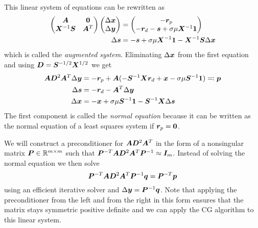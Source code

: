 This linear system of equations can be rewritten as
\begin{subequations}\label{eqn:augmented-system}
  \begin{align}
    \begin{pmatrix}
      \bm{A}              & \bm{0} \\
      \bm{X}^{-1} \bm{S} & \bm{A}^T \\
    \end{pmatrix}
    \begin{pmatrix}
      \Delta\bm{x} \\
      \Delta\bm{y}
    \end{pmatrix}
    &=
    \begin{pmatrix}
      -\bm{r}_p \\
      -\bm{r}_d -\bm{s} + \sigma \mu \bm{X}^{-1} \bm{1}
    \end{pmatrix} \\
    \Delta\bm{s} &= -\bm{s} + \sigma \mu \bm{X}^{-1} \bm{1} - \bm{X}^{-1} \bm{S} \Delta\bm{x}
  \end{align}
\end{subequations}
which is called the \emph{augmented system}.
Eliminating \(\Delta\bm{x}\) from the first equation and using \(\bm{D} = \bm{S}^{-1/2} \bm{X}^{1/2}\) we get
\begin{subequations}\label{eqn:normal-equation-system}
  \begin{align}
    \bm{A} \bm{D}^2 \bm{A}^T \Delta\bm{y} &= -\bm{r}_p + \bm{A} ( -\bm{S}^{-1} \bm{X} \bm{r}_d + \bm{x} - \sigma \mu \bm{S}^{-1} \bm{1} ) \eqqcolon \bm{p} \label{eqn:normal-equation} \\
    \Delta\bm{s} &= -\bm{r}_d - \bm{A}^T \Delta\bm{y} \label{eqn:s-from-normal} \\
    \Delta\bm{x} &= -\bm{x} + \sigma \mu \bm{S}^{-1} \bm{1} - \bm{S}^{-1} \bm{X} \Delta\bm{s} \label{eqn:x-from-normal}
  \end{align}
\end{subequations}
The first component is called the \emph{normal equation} because it can be written as the normal equation of a least squares system if \(\bm{r}_p = \bm{0}\).

We will construct a preconditioner for \(\bm{A} \bm{D}^2 \bm{A}^T\) in the form of a nonsingular matrix \(\bm{P} \in \mathbb{R}^{m \times m}\) such that
\( \bm{P}^{-T} \bm{A} \bm{D}^2 \bm{A}^T \bm{P}^{-1} \approx \bm{I}_m \).
Instead of solving the normal equation we then solve
\begin{equation} \label{eqn:preconditioned-system}
 \bm{P}^{-T} \bm{A} \bm{D}^2 \bm{A}^T \bm{P}^{-1} \bm{q} = \bm{P}^{-T} \bm{p}
\end{equation}
using an efficient iterative solver and \(\Delta\bm{y} = \bm{P}^{-1} \bm{q}\).
Note that applying the preconditioner from the left and from the right in this form ensures that the matrix stays symmetric positive definite and we can apply the CG algorithm to this linear system.

